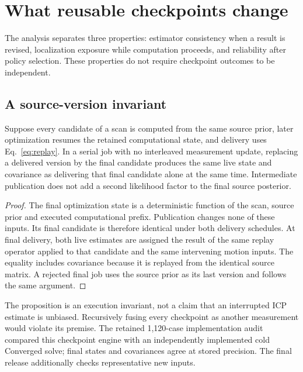 \section{What reusable checkpoints change}\label{sec:theory}
The analysis separates three properties: estimator consistency when a result is revised, localization exposure while computation proceeds, and reliability after policy selection. These properties do not require checkpoint outcomes to be independent.

\subsection{A source-version invariant}
\begin{proposition}\label{prop:version}
Suppose every candidate of a scan is computed from the same source prior, later optimization resumes the retained computational state, and delivery uses Eq.~\eqref{eq:replay}. In a serial job with no interleaved measurement update, replacing a delivered version by the final candidate produces the same live state and covariance as delivering that final candidate alone at the same time. Intermediate publication does not add a second likelihood factor to the final source posterior.
\end{proposition}
\begin{proof}
The final optimization state is a deterministic function of the scan, source prior and executed computational prefix. Publication changes none of these inputs. Its final candidate is therefore identical under both delivery schedules. At final delivery, both live estimates are assigned the result of the same replay operator applied to that candidate and the same intervening motion inputs. The equality includes covariance because it is replayed from the identical source matrix. A rejected final job uses the source prior as its last version and follows the same argument.
\end{proof}
The proposition is an execution invariant, not a claim that an interrupted ICP estimate is unbiased. Recursively fusing every checkpoint as another measurement would violate its premise. The retained 1,120-case implementation audit compared this checkpoint engine with an independently implemented cold Converged solve; final states and covariances agree at stored precision. The final release additionally checks representative new inputs.

